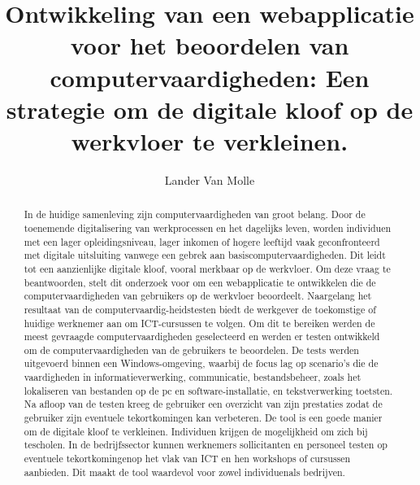\documentclass{hogent-article}
\title{Ontwikkeling van een webapplicatie voor het beoordelen van computervaardigheden: Een strategie om de digitale kloof op de werkvloer te verkleinen.}
\author{Lander {Van Molle}}
\begin{document}
\begin{abstract}
  In de huidige samenleving zijn computervaardigheden van groot belang. Door de toenemende digitalisering van werkprocessen en het dagelijks leven, worden individuen met een lager opleidingsniveau, lager inkomen of hogere leeftijd vaak geconfronteerd met digitale uitsluiting vanwege een gebrek aan basiscomputervaardigheden. Dit leidt tot een aanzienlijke digitale kloof, vooral merkbaar op de werkvloer.
  Om deze vraag te beantwoorden, stelt dit onderzoek voor om een webapplicatie te ontwikkelen die de computervaardigheden van gebruikers op de werkvloer beoordeelt. Naargelang het resultaat van de computervaardig-heidstesten biedt de werkgever de toekomstige of huidige werknemer aan om ICT-cursussen te volgen. Om dit te bereiken werden de meest gevraagde computervaardigheden geselecteerd en werden er testen ontwikkeld om de computervaardigheden van de gebruikers te beoordelen.
  De tests werden uitgevoerd binnen een Windows-omgeving, waarbij de focus lag op scenario's die de vaardigheden in informatieverwerking, communicatie, bestandsbeheer, zoals het lokaliseren van bestanden op de pc en software-installatie, en tekstverwerking toetsten. Na afloop van de testen kreeg de gebruiker een overzicht van zijn prestaties zodat de gebruiker zijn eventuele tekortkomingen kan verbeteren. De tool is een goede manier om de digitale kloof te verkleinen. Individuen krijgen de mogelijkheid om zich bij tescholen.
  In de bedrijfssector kunnen werknemers sollicitanten en personeel testen op eventuele tekortkomingenop het vlak van ICT en hen workshops of cursussen aanbieden. Dit maakt de tool waardevol voor zowel individuenals bedrijven.
\end{abstract}

\tableofcontents



\printbibliography[heading=bibintoc]
\end{document}
